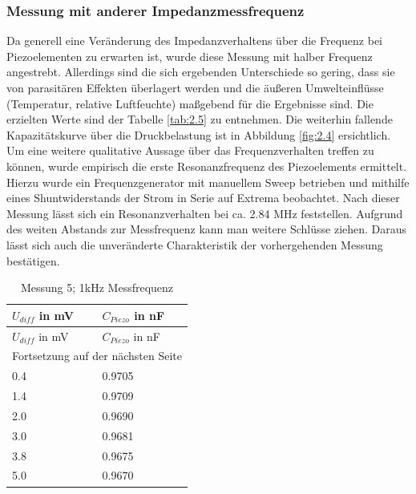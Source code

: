 \documentclass[12pt]{scrreprt} %
\begin{document}
\subsubsection{Messung mit anderer Impedanzmessfrequenz}
Da generell eine Veränderung des Impedanzverhaltens über die Frequenz bei Piezoelementen zu erwarten ist, wurde diese Messung mit halber Frequenz angestrebt. Allerdings sind die sich ergebenden Unterschiede so gering, dass sie von parasitären Effekten überlagert werden und die äußeren Umwelteinflüsse (Temperatur, relative Luftfeuchte) maßgebend für die Ergebnisse sind. Die erzielten Werte sind der Tabelle \vref{tab:2.5} zu entnehmen. Die weiterhin fallende Kapazitätskurve über die Druckbelastung ist in Abbildung \vref{fig:2.4} ersichtlich.\\
Um eine weitere qualitative Aussage über das Frequenzverhalten treffen zu können, wurde empirisch die erste Resonanzfrequenz des Piezoelements ermittelt. Hierzu wurde ein Frequenzgenerator mit manuellem Sweep betrieben und mithilfe eines Shuntwiderstands der Strom in Serie auf Extrema beobachtet. Nach dieser Messung lässt sich ein Resonanzverhalten bei ca. 2.84 MHz feststellen. Aufgrund des weiten Abstands zur Messfrequenz kann man weitere Schlüsse ziehen. Daraus lässt sich auch die unveränderte Charakteristik der vorhergehenden Messung bestätigen.

\setlongtables
\begin{longtable}{| l | l |}
\caption{Messung 5; 1kHz Messfrequenz}\\
\hline
$U_{diff}$ in mV&$C_{Piezo}$ in nF\\
\hline
\endfirsthead
\hline
$U_{diff}$ in mV&$C_{Piezo}$ in nF\\
\hline
\endhead
\hline
\multicolumn{2}{|c|}{Fortsetzung auf der nächsten Seite}\\
\hline
\endfoot
\hline \hline
\endlastfoot
\hline
\label{tab:2.5}%
0.4&0.9705\\
1.4&0.9709\\
2.0&0.9690\\
3.0&0.9681\\
3.8&0.9675\\
5.0&0.9670\\
\end{longtable}
\end{document}
